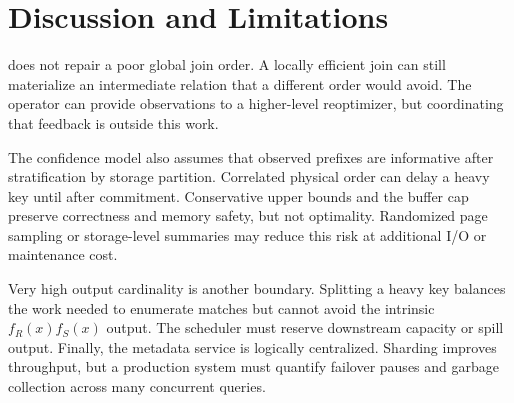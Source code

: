 \section{Discussion and Limitations}
\label{sec:discussion}

\system{} does not repair a poor global join order.  A locally efficient join
can still materialize an intermediate relation that a different order would
avoid.  The operator can provide observations to a higher-level reoptimizer,
but coordinating that feedback is outside this work.

The confidence model also assumes that observed prefixes are informative after
stratification by storage partition.  Correlated physical order can delay a
heavy key until after commitment.  Conservative upper bounds and the buffer cap
preserve correctness and memory safety, but not optimality.  Randomized page
sampling or storage-level summaries may reduce this risk at additional I/O or
maintenance cost.

Very high output cardinality is another boundary.  Splitting a heavy key
balances the work needed to enumerate matches but cannot avoid the intrinsic
$f_R(x)f_S(x)$ output.  The scheduler must reserve downstream capacity or spill
output.  Finally, the metadata service is logically centralized.  Sharding
improves throughput, but a production system must quantify failover pauses and
garbage collection across many concurrent queries.
